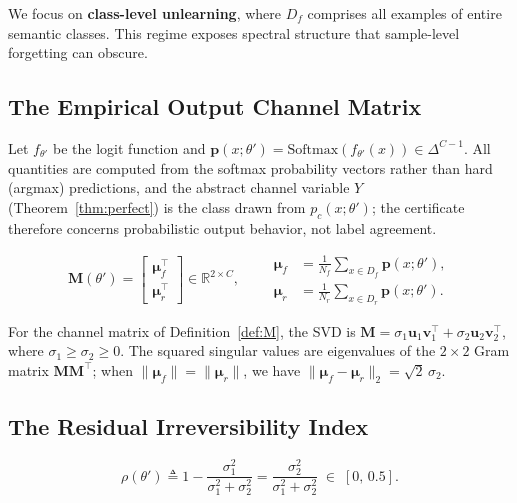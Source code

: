 \documentclass[smallextended]{svjour3}       %
\newcommand{\coloneqq}{\triangleq}
\begin{document}
We focus on \textbf{class-level unlearning}, where $D_f$ comprises all examples of entire semantic classes. This regime exposes spectral structure that sample-level forgetting can obscure.

\subsection{The Empirical Output Channel Matrix}

Let $f_{\theta'}$ be the logit function and $\mathbf{p}(x;\theta') = \mathrm{Softmax}(f_{\theta'}(x)) \in \Delta^{C-1}$. All quantities are computed from the softmax probability vectors rather than hard (argmax) predictions, and the abstract channel variable $Y$ (Theorem~\ref{thm:perfect}) is the class drawn from $p_c(x;\theta')$; the certificate therefore concerns probabilistic output behavior, not label agreement.

\begin{definition}
\label{def:M}
\begin{equation}
\mathbf{M}(\theta') =
\begin{bmatrix}
\boldsymbol{\mu}_f^\top \\ \boldsymbol{\mu}_r^\top
\end{bmatrix}
\in \mathbb{R}^{2\times C},
\qquad
\begin{aligned}
\boldsymbol{\mu}_f &= \frac{1}{N_f}\sum_{x\in D_f} \mathbf{p}(x;\theta'),\\
\boldsymbol{\mu}_r &= \frac{1}{N_r}\sum_{x\in D_r} \mathbf{p}(x;\theta').
\end{aligned}
\end{equation}
\end{definition}

For the channel matrix of Definition~\ref{def:M}, the SVD is $\mathbf{M} = \sigma_1 \mathbf{u}_1 \mathbf{v}_1^\top + \sigma_2 \mathbf{u}_2 \mathbf{v}_2^\top$, where $\sigma_1 \ge \sigma_2 \ge 0$. The squared singular values are eigenvalues of the $2\times 2$ Gram matrix $\mathbf{M}\mathbf{M}^\top$; when $\|\boldsymbol{\mu}_f\| = \|\boldsymbol{\mu}_r\|$, we have $\|\boldsymbol{\mu}_f - \boldsymbol{\mu}_r\|_2 = \sqrt{2}\,\sigma_2$.

\subsection{The Residual Irreversibility Index}

\begin{definition}[RII]
\label{def:rii}
\begin{equation}
\rho(\theta') \coloneqq 1 - \frac{\sigma_1^2}{\sigma_1^2 + \sigma_2^2}
= \frac{\sigma_2^2}{\sigma_1^2 + \sigma_2^2}
\;\in\; [0,\,0.5].
\label{eq:rho}
\end{equation}
\end{definition}
\end{document}
